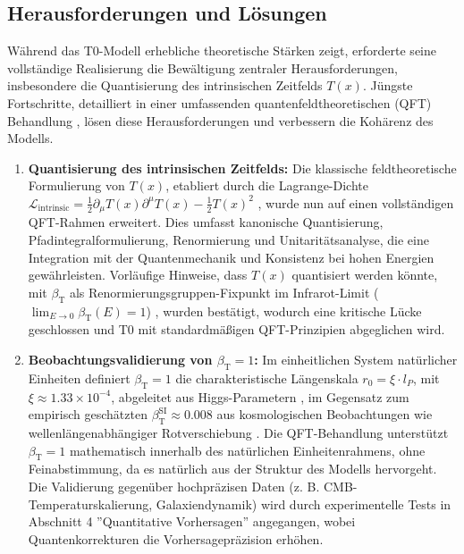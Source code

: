 \documentclass[12pt,a4paper]{article}
\newcommand{\Tfield}{T(x)}
\newcommand{\betaT}{\beta_{\text{T}}}
\newcommand{\calL}{\mathcal{L}}
\begin{document}
	\subsection{Herausforderungen und Lösungen}
	\label{subsec:challenges}
	
	Während das T0-Modell erhebliche theoretische Stärken zeigt, erforderte seine vollständige Realisierung die Bewältigung zentraler Herausforderungen, insbesondere die Quantisierung des intrinsischen Zeitfelds \(\Tfield\). Jüngste Fortschritte, detailliert in einer umfassenden quantenfeldtheoretischen (QFT) Behandlung \cite{pascher_qft_2025}, lösen diese Herausforderungen und verbessern die Kohärenz des Modells.
	
	\begin{enumerate}
		\item \textbf{Quantisierung des intrinsischen Zeitfelds:} Die klassische feldtheoretische Formulierung von \(\Tfield\), etabliert durch die Lagrange-Dichte \(\calL_{\text{intrinsic}} = \frac{1}{2}\partial_{\mu}\Tfield\partial^{\mu}\Tfield - \frac{1}{2}\Tfield^2\) \cite{pascher_lagrange_2025}, wurde nun auf einen vollständigen QFT-Rahmen erweitert. Dies umfasst kanonische Quantisierung, Pfadintegralformulierung, Renormierung und Unitaritätsanalyse, die eine Integration mit der Quantenmechanik und Konsistenz bei hohen Energien gewährleisten. Vorläufige Hinweise, dass \(\Tfield\) quantisiert werden könnte, mit \(\betaT\) als Renormierungsgruppen-Fixpunkt im Infrarot-Limit (\(\lim_{E \to 0} \betaT(E) = 1\)) \cite{pascher_alphabeta_2025}, wurden bestätigt, wodurch eine kritische Lücke geschlossen und T0 mit standardmäßigen QFT-Prinzipien abgeglichen wird.
		
		\item \textbf{Beobachtungsvalidierung von \(\betaT = 1\):} Im einheitlichen System natürlicher Einheiten definiert \(\betaT = 1\) die charakteristische Längenskala \(r_0 = \xi \cdot l_P\), mit \(\xi \approx 1.33 \times 10^{-4}\), abgeleitet aus Higgs-Parametern \cite{pascher_params_2025, pascher_alphabeta_2025}, im Gegensatz zum empirisch geschätzten \(\betaT^{\text{SI}} \approx 0.008\) aus kosmologischen Beobachtungen wie wellenlängenabhängiger Rotverschiebung \cite{pascher_messdifferenzen_2025}. Die QFT-Behandlung unterstützt \(\betaT = 1\) mathematisch innerhalb des natürlichen Einheitenrahmens, ohne Feinabstimmung, da es natürlich aus der Struktur des Modells hervorgeht. Die Validierung gegenüber hochpräzisen Daten (z. B. CMB-Temperaturskalierung, Galaxiendynamik) wird durch experimentelle Tests in Abschnitt 4 ''Quantitative Vorhersagen'' angegangen, wobei Quantenkorrekturen die Vorhersagepräzision erhöhen.
	\end{enumerate}
	
\end{document}
